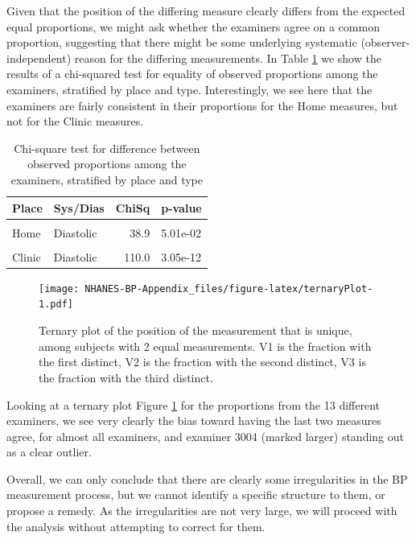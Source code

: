 \documentclass[
]{article}
\begin{document}
Given that the position of the differing measure clearly differs from the expected equal proportions, we might ask whether the examiners agree on a common proportion, suggesting that there might be some underlying systematic (observer-independent) reason for the differing measurements.
In Table \ref{tab:ternaryChi2} we show the results of a chi-squared test for equality of observed proportions among the examiners, stratified by place and type.
Interestingly, we see here that the examiners are fairly consistent in their proportions for the Home measures, but not for the Clinic measures.

\begin{table}[!h]

\caption{\label{tab:ternaryChi2}Chi-square test for difference between observed proportions among the examiners, stratified by place and type}
\centering
\begin{tabular}[t]{llrl}
\toprule
Place & Sys/Dias & ChiSq & p-value\\
\midrule
\cellcolor{gray!6}{Home} & \cellcolor{gray!6}{Systolic} & \cellcolor{gray!6}{32.8} & \cellcolor{gray!6}{1.69e-01}\\
Home & Diastolic & 38.9 & 5.01e-02\\
\cellcolor{gray!6}{Clinic} & \cellcolor{gray!6}{Systolic} & \cellcolor{gray!6}{60.0} & \cellcolor{gray!6}{1.67e-04}\\
Clinic & Diastolic & 110.0 & 3.05e-12\\
\bottomrule
\end{tabular}
\end{table}

\begin{figure}
\centering
\texttt{[image: NHANES-BP-Appendix\_files/figure-latex/ternaryPlot-1.pdf]}
\caption{\label{fig:ternaryPlot}Ternary plot of the position of the measurement that is unique, among subjects with 2 equal measurements. V1 is the fraction with the first distinct, V2 is the fraction with the second distinct, V3 is the fraction with the third distinct.}
\end{figure}

Looking at a ternary plot Figure \ref{fig:ternaryPlot} for the proportions from the 13 different examiners, we see very clearly the bias toward having the last two measures agree, for almost all examiners, and examiner 3004 (marked larger) standing out as a clear outlier.

Overall, we can only conclude that there are clearly some irregularities in the BP measurement process, but we cannot identify a specific structure to them, or propose a remedy.
As the irregularities are not very large, we will proceed with the analysis without attempting to correct for them.
\end{document}
